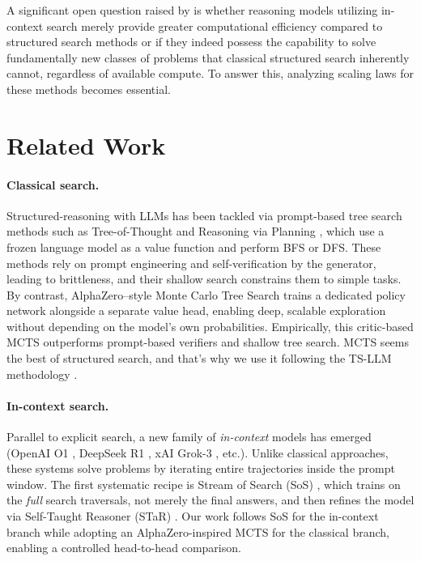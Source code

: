\documentclass{article}
\begin{document}
A significant open question raised by \cite{xiang2025towards} is whether reasoning models utilizing in-context search merely provide greater computational efficiency compared to structured search methods or if they indeed possess the capability to solve fundamentally new classes of problems that classical structured search inherently cannot, regardless of available compute. To answer this, analyzing scaling laws for these methods becomes essential.


\section{Related Work}

\paragraph{Classical search.}
Structured-reasoning with LLMs has been tackled via prompt-based tree search methods such as Tree-of-Thought \cite{yao2023tree} and Reasoning via Planning \cite{hao-etal-2023-reasoning}, which use a frozen language model as a value function and perform BFS or DFS. These methods rely on prompt engineering and self-verification by the generator, leading to brittleness, and their shallow search constrains them to simple tasks. By contrast, AlphaZero–style Monte Carlo Tree Search trains a dedicated policy network alongside a separate value head, enabling deep, scalable exploration without depending on the model’s own probabilities. Empirically, this critic-based MCTS outperforms prompt-based verifiers and shallow tree search. MCTS seems the best of structured search, and that’s why we use it following the TS-LLM methodology \cite{feng2023alphazero}.

\paragraph{In-context search.}
Parallel to explicit search, a new family of \emph{in-context} models has emerged (OpenAI O1 \cite{openai-o1-2412.16720}, DeepSeek R1 \cite{deepseek-r1-2501.12948}, xAI Grok-3 \cite{xai-grok-3-2025}, etc.).  Unlike classical approaches, these systems solve problems by iterating entire trajectories inside the prompt window. The first systematic recipe is Stream of Search (SoS) \cite{gandhi2024stream}, which trains on the \textit{full} search traversals, not merely the final answers, and then refines the model via Self-Taught Reasoner (STaR) \cite{zelikman2022star}. Our work follows SoS for the in-context branch while adopting an AlphaZero-inspired MCTS for the classical branch, enabling a controlled head-to-head comparison.
\end{document}
